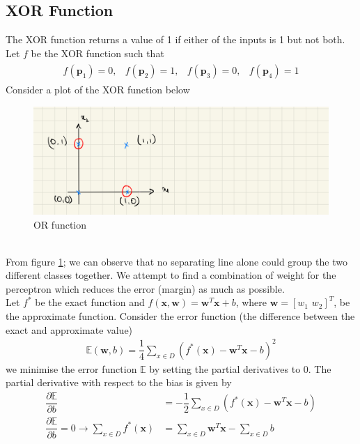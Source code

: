 \subsection{XOR Function}
The XOR function returns a value of 1 if either of the inputs is 1 but not both. Let $f$ be the XOR function such that
\begin{align}
  \begin{matrix}
    f(\textbf{p}_1)=0,&   f(\textbf{p}_2)=1 ,& f(\textbf{p}_3)=0,&   f(\textbf{p}_4)=1
    \label{eq:XOR_function}    
  \end{matrix}
\end{align}
Consider a plot of the XOR function below 
\begin{figure}[ht]
  \centering
  \includegraphics[scale=0.15]{CHAPTER_2/c2_rig_XOR.jpeg}
  \caption{OR function}
  \label{XOR_function}
\end{figure}\\
From figure \ref{XOR_function}; we can observe that no separating line alone could group the two different classes together. We attempt to find a combination of weight for the perceptron which reduces the error (margin) as much as possible.\\
\noindent Let $f^{*}$ be the exact function and $f(\textbf{x},\textbf{w}) = \textbf{w}^T\textbf{x} + b$, where $\textbf{w} = [w_1 \, \, w_2]^T$, be the approximate function. Consider the error function (the difference between the exact and approximate value)
\begin{align}
  \label{eq:error_XOR_prob}
  \mathbb{E}(\textbf{w},b) = \dfrac{1}{4} \sum_{x\in D}(f^{*}(\textbf{x})- \textbf{w}^T\textbf{x}-b)^2
\end{align}
we minimise the error function $\mathbb{E}$ by setting the partial derivatives to 0. The partial derivative with respect to the bias is given by
\begin{align}
  \nonumber
  \dfrac{\partial \mathbb{E}}{\partial b} &= -\dfrac{1}{2} \sum_{x\in D}(f^{*}(\textbf{x})- \textbf{w}^T\textbf{x}-b)\\
  \label{eq:bias_derivative}
  \dfrac{\partial \mathbb{E}}{\partial b} = 0\rightarrow \sum_{x\in D}f^{*}(\textbf{x}) &= \sum_{x\in D}\textbf{w}^T\textbf{x}- \sum_{x\in D}b
\end{align}
